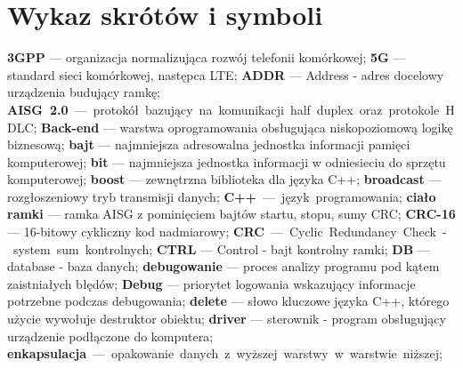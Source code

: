 \chapter*{Wykaz skrótów i symboli}
\noindent\textbf{3GPP} --- organizacja normalizująca rozwój telefonii komórkowej;\newline
\textbf{5G} --- standard sieci komórkowej, następca LTE;\newline
\textbf{ADDR} --- Address - adres docelowy urządzenia budujący ramkę;\newline
\textbf{AISG 2.0} --- protokół bazujący na komunikacji half duplex oraz protokole HDLC;\newline
\textbf{Back-end} --- warstwa oprogramowania obsługująca niskopoziomową logikę biznesową;\newline
\textbf{bajt} --- najmniejsza adresowalna jednostka informacji pamięci komputerowej;\newline
\textbf{bit} --- najmniejsza jednostka informacji w odniesieciu do sprzętu komputerowej;\newline
\textbf{boost} --- zewnętrzna biblioteka dla języka C++;\newline
\textbf{broadcast} --- rozgłoszeniowy tryb transmisji danych;\newline
\textbf{C++} --- język programowania;\newline
\textbf{ciało ramki} --- ramka AISG z pominięciem bajtów startu, stopu, sumy CRC;\newline
\textbf{CRC-16} --- 16-bitowy cykliczny kod nadmiarowy;\newline
\textbf{CRC} --- Cyclic Redundancy Check - system sum kontrolnych;\newline
\textbf{CTRL} --- Control - bajt kontrolny ramki;\newline
\textbf{DB} --- database - baza danych;\newline
\textbf{debugowanie} --- proces analizy programu pod kątem zaistniałych błędów;\newline
\textbf{Debug} --- priorytet logowania wskazujący informacje potrzebne podczas debugowania;\newline
\textbf{delete} --- słowo kluczowe języka C++, którego użycie wywołuje destruktor obiektu;\newline
\textbf{driver} --- sterownik - program obsługujący urządzenie podłączone do komputera;\newline
\textbf{enkapsulacja} --- opakowanie danych z wyższej warstwy w warstwie niższej;\newline
